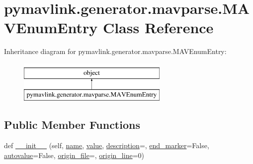 \hypertarget{classpymavlink_1_1generator_1_1mavparse_1_1MAVEnumEntry}{}\section{pymavlink.\+generator.\+mavparse.\+M\+A\+V\+Enum\+Entry Class Reference}
\label{classpymavlink_1_1generator_1_1mavparse_1_1MAVEnumEntry}
Inheritance diagram for pymavlink.\+generator.\+mavparse.\+M\+A\+V\+Enum\+Entry\+:\begin{figure}[H]
\begin{center}
\leavevmode
\includegraphics[height=2.000000cm]{classpymavlink_1_1generator_1_1mavparse_1_1MAVEnumEntry}
\end{center}
\end{figure}
\subsection*{Public Member Functions}
\begin{DoxyCompactItemize}
\item 
def \mbox{\hyperlink{classpymavlink_1_1generator_1_1mavparse_1_1MAVEnumEntry_af04252e1c346345682e28d8e0151b296}{\+\_\+\+\_\+init\+\_\+\+\_\+}} (self, \mbox{\hyperlink{classpymavlink_1_1generator_1_1mavparse_1_1MAVEnumEntry_a93164deaf93099ff9969b0744843fc05}{name}}, \mbox{\hyperlink{classpymavlink_1_1generator_1_1mavparse_1_1MAVEnumEntry_a9c52385757eaadbc51b454b359d7b49e}{value}}, \mbox{\hyperlink{classpymavlink_1_1generator_1_1mavparse_1_1MAVEnumEntry_a1bf829dd3493dd2c870f7c31edefc293}{description}}=\textquotesingle{}\textquotesingle{}, \mbox{\hyperlink{classpymavlink_1_1generator_1_1mavparse_1_1MAVEnumEntry_a396daeb4180aa6fa3947f02fbff103ee}{end\+\_\+marker}}=False, \mbox{\hyperlink{classpymavlink_1_1generator_1_1mavparse_1_1MAVEnumEntry_a6d1e6a9cc71f85db360f8b1a6316e70d}{autovalue}}=False, \mbox{\hyperlink{classpymavlink_1_1generator_1_1mavparse_1_1MAVEnumEntry_a492a7d08b0c02dc8566f12c4abd4fca5}{origin\+\_\+file}}=\textquotesingle{}\textquotesingle{}, \mbox{\hyperlink{classpymavlink_1_1generator_1_1mavparse_1_1MAVEnumEntry_af0afe9aac5abeaf6a0c234b9a13060f0}{origin\+\_\+line}}=0)
\end{DoxyCompactItemize}
